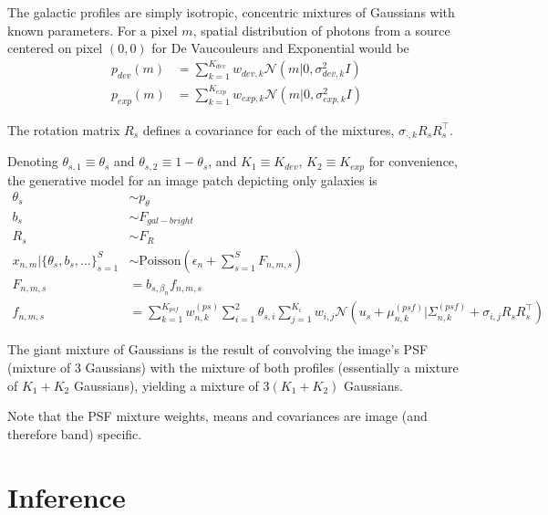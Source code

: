 \documentclass[11pt]{article}
\newcommand{\trans}{\intercal}
\begin{document}

The galactic profiles are simply isotropic, concentric mixtures of Gaussians with known parameters.  For a pixel $m$, spatial distribution of photons from a source centered on pixel $(0,0)$ for De Vaucouleurs and Exponential would be
\begin{align}
  p_{dev}(m) &= \sum_{k=1}^{K_{dev}} w_{dev, k} \mathcal{N}\left(m | 0, \sigma^2_{dev, k} I \right) \\
  p_{exp}(m) &= \sum_{k=1}^{K_{exp}} w_{exp, k} \mathcal{N}\left(m | 0, \sigma^2_{exp, k} I \right)
\end{align}

The rotation matrix $R_s$ defines a covariance for each of the mixtures, $\sigma_{\cdot, k} R_s R_s^\trans$. 

Denoting $\theta_{s,1} \equiv \theta_{s}$ and $\theta_{s,2} \equiv 1-\theta_{s}$, and $K_1 \equiv K_{dev}$, $K_2 \equiv K_{exp}$ for convenience, the generative model for an image patch depicting only galaxies is 
\begin{align}
  \theta_s &\sim p_\theta \\
  b_s      &\sim F_{gal-bright} \\
  R_s      &\sim F_{R} \\
  x_{n,m} | \{ \theta_s, b_s,...\}_{s=1}^S &\sim \textrm{Poisson}\left( \epsilon_n + \sum_{s=1}^S F_{n,m,s} \right) \\
  F_{n,m,s} &= b_{s, \beta_n} f_{n,m,s} \\
  f_{n,m,s} 
    &= \sum_{k=1}^{K_{psf}} w^{(ps)}_{n,k} 
       \sum_{i=1}^2 \theta_{s,i} 
       \sum_{j=1}^{K_i} w_{i, j} \mathcal{N} \left( u_s + \mu^{(psf)}_{n,k} | \Sigma^{(psf)}_{n,k} + \sigma_{i,j} R_s R_s^\trans \right)
\end{align}

The giant mixture of Gaussians is the result of convolving the image's PSF (mixture of 3 Gaussians) with the mixture of both profiles (essentially a mixture of $K_1 + K_2$ Gaussians), yielding a mixture of $3(K_1 + K_2)$ Gaussians.  
 
Note that the PSF mixture weights, means and covariances are image (and therefore band) specific. 


\section{Inference}
\end{document}
